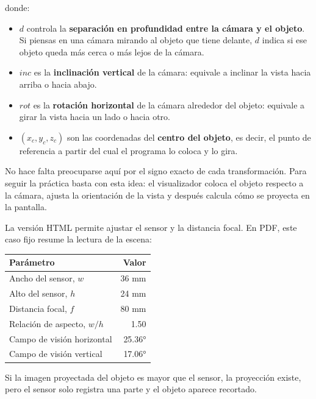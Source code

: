 \documentclass[
  spanish,
  11pt,
  a4paper,
  DIV=11,
  numbers=noendperiod]{scrartcl}
\providecommand{\tightlist}{%
  \setlength{\itemsep}{0pt}\setlength{\parskip}{0pt}}
\begin{document}
\begin{tcolorbox}
donde:

\begin{itemize}
\tightlist
\item
  \(d\) controla la \textbf{separación en profundidad entre la cámara y el objeto}. Si piensas en una cámara mirando al objeto que tiene delante, \(d\) indica si ese objeto queda más cerca o más lejos de la cámara.
\item
  \(inc\) es la \textbf{inclinación vertical} de la cámara: equivale a inclinar la vista hacia arriba o hacia abajo.
\item
  \(rot\) es la \textbf{rotación horizontal} de la cámara alrededor del objeto: equivale a girar la vista hacia un lado o hacia otro.
\item
  \((x_c, y_c, z_c)\) son las coordenadas del \textbf{centro del objeto}, es decir, el punto de referencia a partir del cual el programa lo coloca y lo gira.
\end{itemize}

No hace falta preocuparse aquí por el signo exacto de cada transformación. Para seguir la práctica basta con esta idea: el visualizador coloca el objeto respecto a la cámara, ajusta la orientación de la vista y después calcula cómo se proyecta en la pantalla.

\end{tcolorbox}

La versión HTML permite ajustar el sensor y la distancia focal. En PDF, este caso fijo resume la lectura de la escena:

\begin{longtable}[]{@{}lr@{}}
\toprule\noalign{}
Parámetro & Valor \\
\midrule\noalign{}
\endhead
\bottomrule\noalign{}
\endlastfoot
Ancho del sensor, \(w\) & 36 mm \\
Alto del sensor, \(h\) & 24 mm \\
Distancia focal, \(f\) & 80 mm \\
Relación de aspecto, \(w/h\) & 1.50 \\
Campo de visión horizontal & 25.36° \\
Campo de visión vertical & 17.06° \\
\end{longtable}

Si la imagen proyectada del objeto es mayor que el sensor, la proyección existe, pero el sensor solo registra una parte y el objeto aparece recortado.
\end{document}
